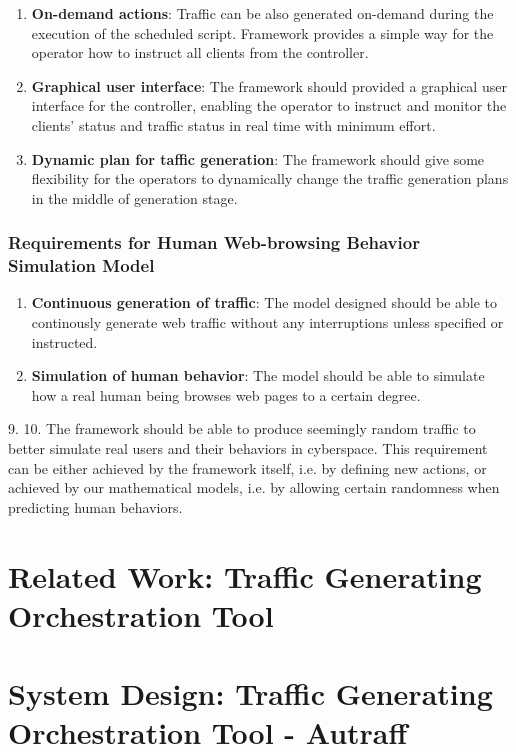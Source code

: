 \documentclass[12pt]{report}
\begin{document}
\begin{enumerate}
\item \textbf{On-demand actions}: Traffic can be also generated on-demand during the execution of the scheduled script. Framework provides a simple way for the operator how to instruct all clients from the controller.
\item \textbf{Graphical user interface}: The framework should provided a graphical user interface for the controller, enabling the operator to instruct and monitor the clients’ status and traffic status in real time with minimum effort.
\item \textbf{Dynamic plan for taffic generation}: The framework should give some flexibility for the operators to dynamically change the traffic generation plans in the middle of generation stage.
\end{enumerate}

\subsection{Requirements for Human Web-browsing Behavior Simulation Model}
\begin{enumerate}
\item \textbf{Continuous generation of traffic}: The model designed should be able to continously generate web traffic without any interruptions unless specified or instructed. 
\item \textbf{Simulation of human behavior}: The model should be able to simulate how a real human being browses web pages to a certain degree.

\end{enumerate}

9. 
10. The framework should be able to produce seemingly random traffic to better simulate real users and their behaviors in cyberspace. This requirement can be either achieved by the framework itself, i.e. by defining new actions, or achieved by our mathematical models, i.e. by allowing certain randomness when predicting human behaviors.



\chapter{Related Work: Traffic Generating Orchestration Tool} \label{rw:tfo}

\chapter{System Design: Traffic Generating Orchestration Tool - Autraff} \label{sd}
\end{document}
